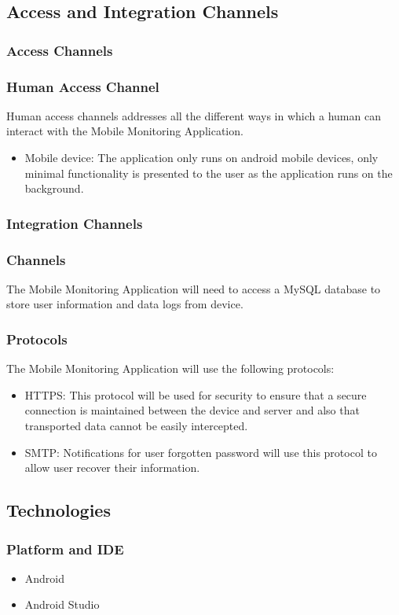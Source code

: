 \documentclass[hidelinks, 12pt, oneside]{article}
\begin{document}
	\subsection{Access and Integration Channels}
	\subsubsection{Access Channels}
	\subsubsection*{Human Access Channel}
	Human access channels addresses all the different ways in which a human can interact with the Mobile Monitoring Application.
	\begin{itemize}
		\item Mobile device: The application only runs on android mobile devices, only minimal functionality is presented to the user as the application runs on the background.   
	\end{itemize}
	\subsubsection{Integration Channels}
	\subsubsection*{Channels}
	The Mobile Monitoring Application will need to access a MySQL database to store user information and data logs from device.    	\subsubsection*{Protocols}
	The Mobile Monitoring Application will use the following protocols:
	\begin{itemize}
	\item HTTPS: This protocol will be used for security to ensure that a secure connection is maintained between the device and server and also that transported data cannot be easily intercepted.
	\item SMTP: Notifications for user forgotten password will use this protocol to allow user recover their information.  
	\end{itemize}	 
	\newpage
	\subsection{Technologies}
	\subsubsection{Platform and IDE}
	\begin{itemize}
	\item Android
	\item Android Studio
	\end{itemize}
\end{document}
